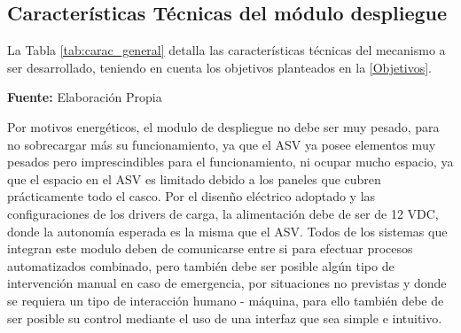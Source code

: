 \subsection[Caracter\'isticas T\'ecnicas de los m\'odulos]{Caracter\'isticas T\'ecnicas del m\'odulo despliegue}
La Tabla \ref{tab:carac_general} detalla las caracter\'isticas t\'ecnicas del mecanismo a ser desarrollado, teniendo en cuenta los objetivos planteados en la  \autoref{Objetivos}.
\begin{table}[H]
\protect\caption[Datos T\'ecnicos]{Datos T\'ecnicos. \label{tab:carac_general}}
    \centering
    \vspace{5mm}
    \newline
    \hfill \textbf{Fuente:} Elaboraci\'on Propia
\end{table}
Por motivos energ\'eticos, el modulo de despliegue no debe ser muy pesado, para no sobrecargar m\'as su funcionamiento, ya que el ASV ya posee elementos muy pesados pero imprescindibles para el funcionamiento, ni ocupar mucho espacio, ya que el espacio en el ASV es limitado debido a los paneles que cubren pr\'acticamente todo el casco. 
Por el disen\~no el\'ectrico adoptado y las configuraciones de los drivers de carga, la alimentación debe de ser de 12 VDC, donde la autonom\'ia esperada es la misma que el ASV. Todos de los sistemas que integran este modulo deben de comunicarse entre si para efectuar procesos automatizados combinado, pero tambi\'en debe ser posible alg\'un tipo de intervenci\'on manual en caso de emergencia, por situaciones no previstas y donde se requiera un tipo de interacci\'on humano - máquina, para ello también debe de ser posible su control mediante el uso de una interfaz que sea simple e intuitivo.

